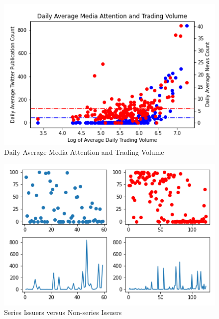 \documentclass[a4paper,12pt]{article}
\begin{document}
\begin{figure}[h]
	\centering
	\caption{Daily Average Media Attention and Trading Volume}
	\label{fig:mediaAtt}
	\includegraphics[scale=0.9]{daily_avg_media.png}
\end{figure}

\begin{figure}[h]
	\centering
	\caption{Series Issuers versus Non-series Issuers}
	\label{fig:subs}
	\includegraphics[scale=0.9]{subsample.png}
\end{figure}
\end{document}
